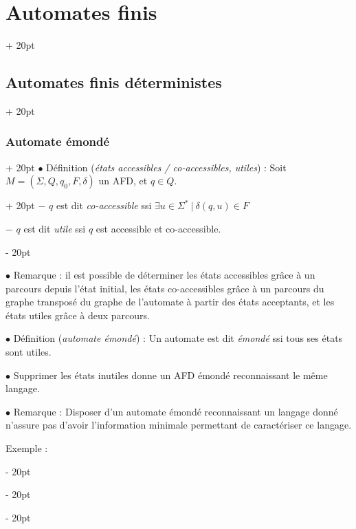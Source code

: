 \documentclass[a4paper, 12pt, twoside]{article}
\newcommand{\ind}[1][20pt]{\advance\leftskip + #1}
\newcommand{\deind}[1][20pt]{\advance\leftskip - #1}
\newenvironment{indt}[2][20pt]{#2 \par \ind[#1]}{\par \deind} %
\begin{document}
\begin{indt}{\section{Automates finis}}
\begin{indt}{\subsection{Automates finis déterministes}}
\begin{indt}{\subsubsection{Automate émondé}}
\begin{indt}{$\bullet$ Définition (\emph{états accessibles / co-accessibles, utiles}) : Soit $M = (\Sigma, Q, q_0, F, \delta)$ un AFD, et $q \in Q$.}
                    $-$ $q$ est dit \emph{co-accessible} ssi $\exists u \in \Sigma^*\ |\ \delta(q, u) \in F$

                    $-$ $q$ est dit \emph{utile} ssi $q$ est accessible et co-accessible.
                \end{indt}

                \vspace{12pt}
                
                $\bullet$ Remarque : il est possible de déterminer les états accessibles grâce à un parcours depuis l'état initial, les états co-accessibles grâce à un parcours du graphe transposé du graphe de l'automate à partir des états acceptants, et les états utiles grâce à deux parcours.

                \vspace{12pt}
                
                $\bullet$ Définition (\emph{automate émondé}) : Un automate est dit \emph{émondé} ssi tous ses états sont utiles.

                \vspace{12pt}
                
                $\bullet$  Supprimer les états inutiles donne un AFD émondé reconnaissant le même langage.

                \vspace{12pt}
                
                $\bullet$ Remarque : Disposer d'un automate émondé reconnaissant un langage donné n'assure pas d'avoir l'information minimale permettant de caractériser ce langage.

                Exemple :

                \begin{center}
                \end{center}


\end{indt}
\end{indt}
\end{indt}
\end{document}

